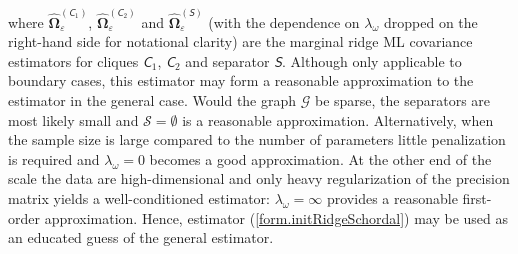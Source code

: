 where $\widehat{\mathbf{\Omega}}_{\varepsilon}^{({\mathsfit{C}_1})}$, $\widehat{\mathbf{\Omega}}_{\varepsilon}^{({\mathsfit{C}_2})}$ and $\widehat{\mathbf{\Omega}}_{\varepsilon}^{({\mathsfit{S}})}$ (with the dependence on $\lambda_{\omega}$ dropped on the right-hand side for notational clarity) are the marginal ridge ML covariance estimators for cliques $\mathsfit{C}_1$, $\mathsfit{C}_2$ and separator $\mathsfit{S}$. Although only applicable to boundary cases, this estimator may form a reasonable approximation to the estimator in the general case. Would the graph $\mathcal{G}$ be sparse, the separators are most likely small and $\mathcal{S} = \emptyset$ is a reasonable approximation. Alternatively, when the sample size is large compared to the number of parameters little penalization is required and $\lambda_{\omega} =0$ becomes a good approximation. At the other end of the scale the data are high-dimensional and only heavy regularization of the precision matrix yields a well-conditioned estimator: $\lambda_{\omega} = \infty$ provides a reasonable first-order approximation. Hence, estimator (\ref{form.initRidgeSchordal}) may be used as an educated guess of the general estimator.

